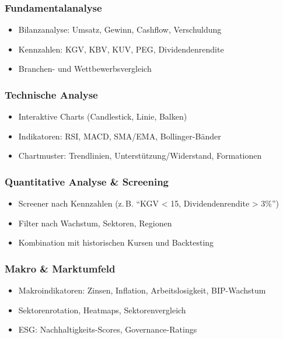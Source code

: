 \documentclass{article}
\begin{document}
\subsubsection*{Fundamentalanalyse}
\begin{itemize}
  \item Bilanzanalyse: Umsatz, Gewinn, Cashflow, Verschuldung
  \item Kennzahlen: KGV, KBV, KUV, PEG, Dividendenrendite
  \item Branchen- und Wettbewerbsvergleich
\end{itemize}

\subsubsection*{Technische Analyse}
\begin{itemize}
  \item Interaktive Charts (Candlestick, Linie, Balken)
  \item Indikatoren: RSI, MACD, SMA/EMA, Bollinger-Bänder
  \item Chartmuster: Trendlinien, Unterstützung/Widerstand, Formationen
\end{itemize}

\subsubsection*{Quantitative Analyse \& Screening}
\begin{itemize}
  \item Screener nach Kennzahlen (z.\,B. \enquote{KGV < 15, Dividendenrendite > 3\%})
  \item Filter nach Wachstum, Sektoren, Regionen
  \item Kombination mit historischen Kursen und Backtesting
\end{itemize}

\subsubsection*{Makro \& Marktumfeld}
\begin{itemize}
  \item Makroindikatoren: Zinsen, Inflation, Arbeitslosigkeit, BIP-Wachstum
  \item Sektorenrotation, Heatmaps, Sektorenvergleich
  \item ESG: Nachhaltigkeits-Scores, Governance-Ratings
\end{itemize}
\end{document}
